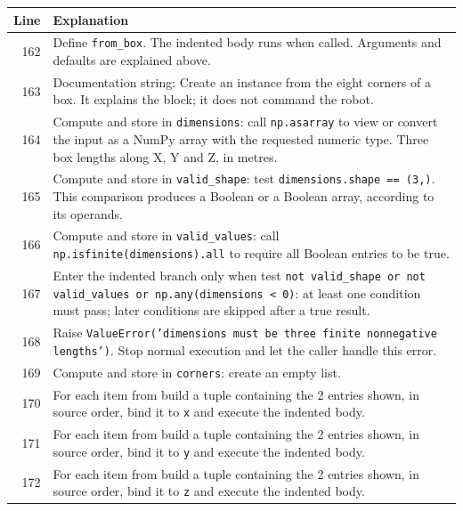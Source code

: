 \documentclass[11pt,a4paper]{book}
\begin{document}
\begin{longtable}{r p{}}

\textbf{Line} & \textbf{Explanation} \\ \hline \endhead

162 & Define \texttt{from\_box}. The indented body runs when called. Arguments and defaults are explained above. \\

163 & Documentation string: Create an instance from the eight corners of a box. It explains the block; it does not command the robot. \\

164 & Compute and store in \texttt{dimensions}: call \texttt{np.asarray} to view or convert the input as a NumPy array with the requested numeric type. Three box lengths along X, Y and Z, in metres. \\

165 & Compute and store in \texttt{valid\_shape}: test \texttt{dimensions.shape == (3,)}. This comparison produces a Boolean or a Boolean array, according to its operands.  \\

166 & Compute and store in \texttt{valid\_values}: call \texttt{np.isfinite(dimensions).all} to require all Boolean entries to be true.  \\

167 & Enter the indented branch only when test \texttt{not valid\_shape or not valid\_values or np.any(dimensions < 0)}: at least one condition must pass; later conditions are skipped after a true result. \\

168 & Raise \texttt{ValueError('dimensions must be three finite nonnegative lengths')}. Stop normal execution and let the caller handle this error. \\

169 & Compute and store in \texttt{corners}: create an empty list.  \\

170 & For each item from build a tuple containing the 2 entries shown, in source order, bind it to \texttt{x} and execute the indented body. \\

171 & For each item from build a tuple containing the 2 entries shown, in source order, bind it to \texttt{y} and execute the indented body. \\

172 & For each item from build a tuple containing the 2 entries shown, in source order, bind it to \texttt{z} and execute the indented body. \\


\end{longtable}
\end{document}
